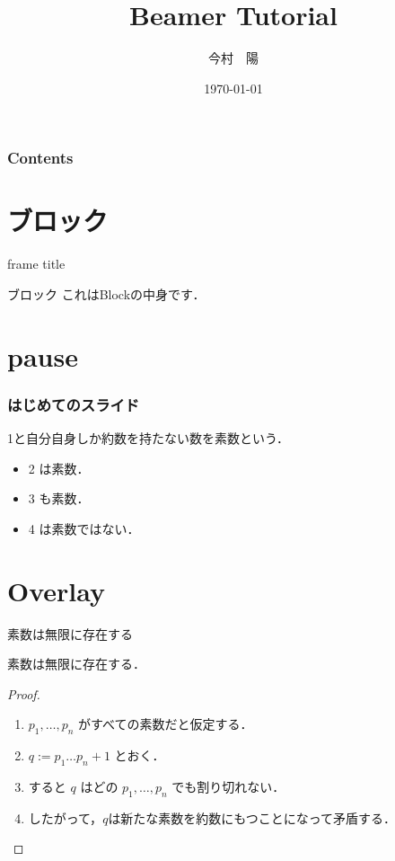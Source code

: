 \documentclass[12pt, unicode]{beamer} %
\title{Beamer Tutorial}
\author[今村]{今村　陽}
\date[\today]{\today}
\institute[京大]{京都大学} %
\begin{document}
\frame{\maketitle}

\begin{frame}
  \frametitle{Contents}
  \tableofcontents %
\end{frame}

\section{ブロック}
\begin{frame}{frame title}
\begin{block}{ブロック}
 これはBlockの中身です．
\end{block}
\end{frame}

\section{pause}
\begin{frame}
 \frametitle{はじめてのスライド}
 \begin{definition}
   1と自分自身しか約数を持たない数を\alert{素数}という．
 \end{definition}
   \begin{itemize}
     \item 2 は素数．
     \pause
     \item 3 も素数．
     \pause
     \item 4 は素数ではない．
  \end{itemize}
 \end{frame}

\section{Overlay}
\begin{frame}{素数は無限に存在する}
\begin{theorem}
素数は無限に存在する．
\end{theorem}
\begin{proof}
 \begin{enumerate}
  \item<1-> $p_1, \dots, p_n$ がすべての素数だと仮定する．%
  \item<2-> $q := p_1 \dots p_n + 1$ とおく．
  \item<3-> すると $q$ はどの $p_1,\dots,p_n$ でも割り切れない．
  \item<1-> したがって，$q$は新たな素数を約数にもつことになって矛盾する．\qedhere
\end{enumerate}
\end{proof}
\end{frame}
\end{document}
